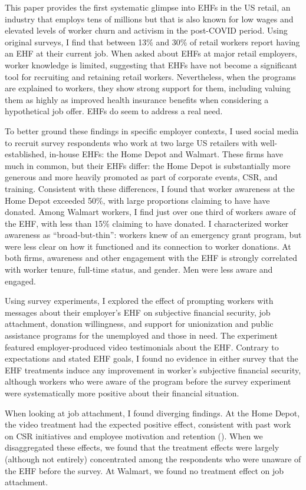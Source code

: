 \documentclass[
  11pt,
  oneside]{article}
\begin{document}
This paper provides the first systematic glimpse into EHFs in the US retail, an industry that employs tens of millions but that is also known for low wages and elevated levels of worker churn and activism in the post-COVID period. Using original surveys, I find that between 13\% and 30\% of retail workers report having an EHF at their current job. When asked about EHFs at major retail employers, worker knowledge is limited, suggesting that EHFs have not become a significant tool for recruiting and retaining retail workers. Nevertheless, when the programs are explained to workers, they show strong support for them, including valuing them as highly as improved health insurance benefits when considering a hypothetical job offer. EHFs do seem to address a real need.

To better ground these findings in specific employer contexts, I used social media to recruit survey respondents who work at two large US retailers with well-established, in-house EHFs: the Home Depot and Walmart. These firms have much in common, but their EHFs differ: the Home Depot is substantially more generous and more heavily promoted as part of corporate events, CSR, and training. Consistent with these differences, I found that worker awareness at the Home Depot exceeded 50\%, with large proportions claiming to have have donated. Among Walmart workers, I find just over one third of workers aware of the EHF, with less than 15\% claiming to have donated. I characterized worker awareness as ``broad-but-thin'': workers knew of an emergency grant program, but were less clear on how it functioned and its connection to worker donations. At both firms, awareness and other engagement with the EHF is strongly correlated with worker tenure, full-time status, and gender. Men were less aware and engaged.

Using survey experiments, I explored the effect of prompting workers with messages about their employer's EHF on subjective financial security, job attachment, donation willingness, and support for unionization and public assistance programs for the unemployed and those in need. The experiment featured employer-produced video testimonials about the EHF. Contrary to expectations and stated EHF goals, I found no evidence in either survey that the EHF treatments induce any improvement in worker's subjective financial security, although workers who were aware of the program before the survey experiment were systematically more positive about their financial situation.

When looking at job attachment, I found diverging findings. At the Home Depot, the video treatment had the expected positive effect, consistent with past work on CSR initiatives and employee motivation and retention (). When we disaggregated these effects, we found that the treatment effects were largely (although not entirely) concentrated among the respondents who were unaware of the EHF before the survey. At Walmart, we found no treatment effect on job attachment.
\end{document}

